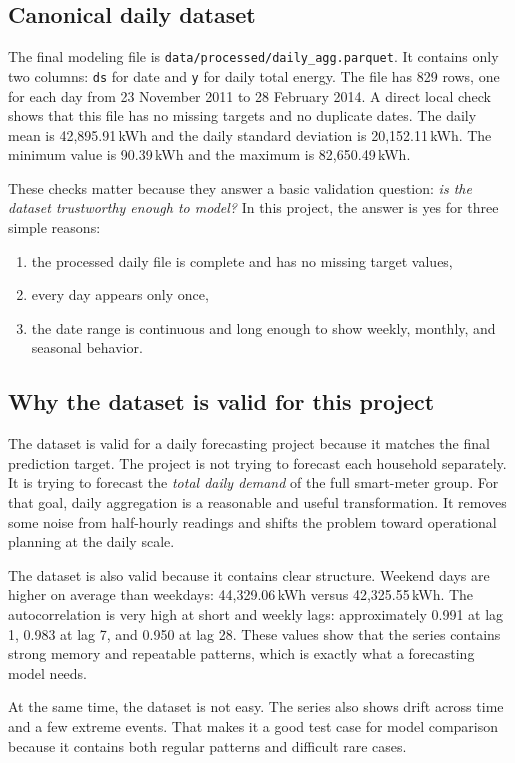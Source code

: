 \documentclass[conference]{IEEEtran}
\begin{document}
\subsection{Canonical daily dataset}
The final modeling file is \texttt{data/processed/daily\_agg.parquet}. It contains only two columns: \texttt{ds} for date and \texttt{y} for daily total energy. The file has 829 rows, one for each day from 23 November 2011 to 28 February 2014. A direct local check shows that this file has no missing targets and no duplicate dates. The daily mean is 42,895.91\,kWh and the daily standard deviation is 20,152.11\,kWh. The minimum value is 90.39\,kWh and the maximum is 82,650.49\,kWh.

These checks matter because they answer a basic validation question: \emph{is the dataset trustworthy enough to model?} In this project, the answer is yes for three simple reasons:
\begin{enumerate}
\item the processed daily file is complete and has no missing target values,
\item every day appears only once,
\item the date range is continuous and long enough to show weekly, monthly, and seasonal behavior.
\end{enumerate}

\subsection{Why the dataset is valid for this project}
The dataset is valid for a daily forecasting project because it matches the final prediction target. The project is not trying to forecast each household separately. It is trying to forecast the \emph{total daily demand} of the full smart-meter group. For that goal, daily aggregation is a reasonable and useful transformation. It removes some noise from half-hourly readings and shifts the problem toward operational planning at the daily scale.

The dataset is also valid because it contains clear structure. Weekend days are higher on average than weekdays: 44,329.06\,kWh versus 42,325.55\,kWh. The autocorrelation is very high at short and weekly lags: approximately 0.991 at lag 1, 0.983 at lag 7, and 0.950 at lag 28. These values show that the series contains strong memory and repeatable patterns, which is exactly what a forecasting model needs.

At the same time, the dataset is not easy. The series also shows drift across time and a few extreme events. That makes it a good test case for model comparison because it contains both regular patterns and difficult rare cases.
\end{document}
